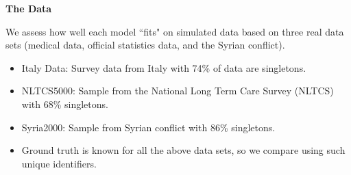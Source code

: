 \documentclass[portrait,a0b,final]{a0poster}
\newenvironment{poster}{
  \begin{center}
  \begin{minipage}[c]{0.98\textwidth}
}{
  \end{minipage}
  \end{center}
}
\begin{document}
\begin{poster}
\begin{multicols}{3}

\begin{center}
\textbf{The Data}
\end{center}
We assess how well each model ``fits" on simulated data based on three real data sets (medical data, official statistics data, and the Syrian conflict).
\begin{itemize}
\item Italy Data: Survey data from Italy with 74\% of data are singletons.
\item NLTCS5000: Sample from the National Long Term Care Survey (NLTCS) with 68\% singletons. 
\item Syria2000: Sample from Syrian conflict with 86\% singletons. 
\item Ground truth is known for all the above data sets, so we compare using such unique identifiers. 

\end{itemize}


\end{multicols}
\end{poster}
\end{document}
